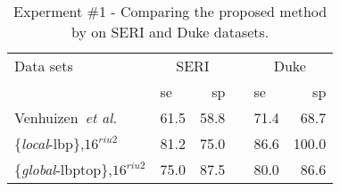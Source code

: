 
\begin{table}[h]
\caption{Experment \#1 - Comparing the proposed method by \cite{Venhuizen2015} on SERI and Duke datasets.}%
\centering
\scriptsize{
\begin{tabular}{l	lr c lr}
\toprule
Data sets 	& \multicolumn{2}{c}{SERI} & & \multicolumn{2}{c}{Duke} \\
  \cmidrule(l){2-3}  \cmidrule(l){5-6}
	         & \ac{se} & \ac{sp} & & \ac{se} & \ac{sp}\\
\midrule
Venhuizen~\textit{et al.} \cite{Venhuizen2015} 		& 61.5 & 58.8 & & 71.4 & 68.7\\
\{\emph{local}-\ac{lbp}\},$16^{riu2}$ 	& 81.2 & 75.0 & & 86.6 & 100.0   \\
\{\emph{global}-\ac{lbptop}\},$16^{riu2}$				& 75.0 & 87.5 & & 80.0 & 86.6  \\


\bottomrule
\end{tabular}}
\label{tab:table1-2}
\end{table}
